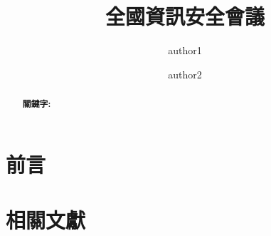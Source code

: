 \documentclass[10pt, a4paper, twocolumn]{article}
\date{}
\begin{document}
\begin{CJK*}{UTF8}{bkai}

\title{\fontsize{16pt}{1}\selectfont\textbf{全國資訊安全會議}}

\author[1]{author1}
\author[2]{author2}
\renewcommand{\Affilfont}{\fontsize{12pt}{1}\bfseries}
\renewcommand{\Authfont}{\fontsize{12pt}{1}\bfseries}
\renewcommand\Authand{, }
\setlength{\affilsep}{1mm}

\maketitle
\pagestyle{empty}
\thispagestyle{empty}
\begin{abstract}

\textbf{關鍵字:}
\end{abstract}


\section{前言}
\section{相關文獻}




\end{CJK*}
\end{document}
